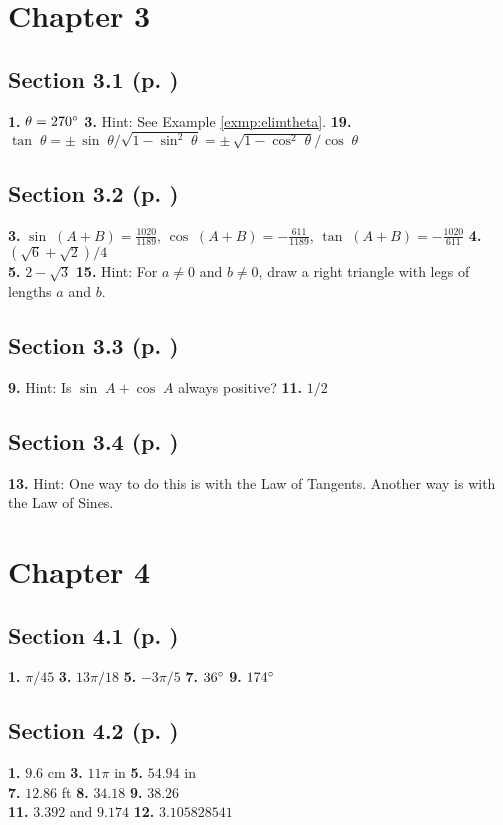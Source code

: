 \begin{multicols}{2}
\section*{Chapter 3}
\subsection*{Section 3.1 (p. \pageref{sec3dot1})}
\textbf{1.} $\theta = 270^\circ$ \quad \textbf{3.} Hint: See Example \ref{exmp:elimtheta}. \quad
\textbf{19.} $\tan\;\theta = \pm\,\sin\;\theta / \sqrt{1 - \sin^2 \;\theta} =
\pm\,\sqrt{1 - \cos^2 \;\theta} / \cos\;\theta$
\subsection*{Section 3.2 (p. \pageref{sec3dot2})}
\textbf{3.} $\sin\;(A+B) = \frac{1020}{1189}$, $\cos\;(A+B) = -\frac{611}{1189}$,
$\tan\;(A+B) = -\frac{1020}{611}$ \quad \textbf{4.} $(\sqrt{6} + \sqrt{2})/4$\\
\textbf{5.} $2 - \sqrt{3}$ \quad \textbf{15.} Hint: For $a \ne 0$ and $b \ne 0$, draw a right
triangle with legs of lengths $a$ and $b$.
\subsection*{Section 3.3 (p. \pageref{sec3dot3})}
\textbf{9.} Hint: Is $\sin\;A + \cos\;A$ always positive? \textbf{11.} $1/2$
\subsection*{Section 3.4 (p. \pageref{sec3dot4})}
\textbf{13.} Hint: One way to do this is with the Law of Tangents. Another way is with the Law of
Sines.
\section*{Chapter 4}
\subsection*{Section 4.1 (p. \pageref{sec4dot1})}
\textbf{1.} $\pi/45$ \quad \textbf{3.} $13\pi/18$ \quad \textbf{5.} $-3\pi/5$ \quad
\textbf{7.} $36^\circ$ \quad \textbf{9.} $174^\circ$
\subsection*{Section 4.2 (p. \pageref{sec4dot2})}
\textbf{1.} $9.6$ cm \quad \textbf{3.} $11\pi$ in \quad \textbf{5.} $54.94$ in\\
\textbf{7.} $12.86$ ft \quad \textbf{8.} $34.18$ \quad \textbf{9.} $38.26$\\
\textbf{11.} $3.392$ and $9.174$ \quad \textbf{12.} $3.105828541$

\end{multicols}
